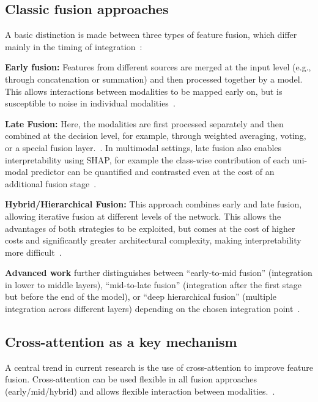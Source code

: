 \subsection{Classic fusion approaches}
A basic distinction is made between three types of feature fusion, which differ mainly in the timing of integration~\parencite{li2024multimodal, li2024fusionreview}:

\textbf{Early fusion:} Features from different sources are merged at the input level (e.g., through concatenation or summation) and then processed together by a model. This allows interactions between modalities to be mapped early on, but is susceptible to noise in individual modalities~\parencite{cai2025multimodal}.

\textbf{Late Fusion:} Here, the modalities are first processed separately and then combined at the decision level, for example, through weighted averaging, voting, or a special fusion layer.~\parencite{sharma2023late}. In multimodal settings, late fusion also enables interpretability using SHAP, for example the class-wise contribution of each uni-modal predictor can be quantified and contrasted even at the cost of an additional fusion stage~\parencite{abdul2024decoding}.

\textbf{Hybrid/Hierarchical Fusion:} This approach combines early and late fusion, allowing iterative fusion at different levels of the network. This allows the advantages of both strategies to be exploited, but comes at the cost of higher costs and significantly greater architectural complexity, making interpretability more difficult~\parencite{li2024multimodal}.

\textbf{Advanced work} further distinguishes between “early-to-mid fusion” (integration in lower to middle layers), “mid-to-late fusion” (integration after the first stage but before the end of the model), or “deep hierarchical fusion” (multiple integration across different layers) depending on the chosen integration point~\parencite{li2024multimodal}.

\subsection{Cross-attention as a key mechanism}
A central trend in current research is the use of cross-attention to improve feature fusion. Cross-attention can be used flexible in all fusion approaches (early/mid/hybrid) and allows flexible interaction between modalities.~\parencite{nagrani2021attention,khan2020mmft}. 

